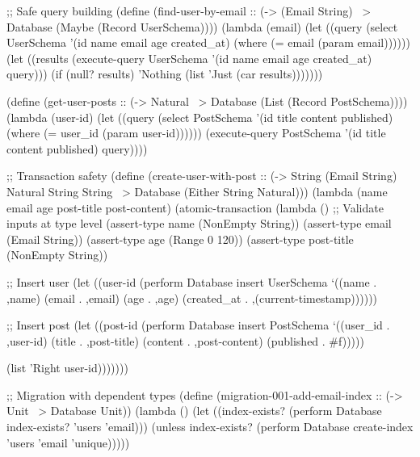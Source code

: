 \begin{example}
\begin{lambdustcode}
;; Safe query building
(define (find-user-by-email :: (-> (Email String) ~> {Database} (Maybe (Record UserSchema))))
  (lambda (email)
    (let ((query (select UserSchema '(id name email age created_at)
                   (where (= email (param email))))))
      (let ((results (execute-query UserSchema '(id name email age created_at) query)))
        (if (null? results)
            'Nothing
            (list 'Just (car results)))))))

(define (get-user-posts :: (-> Natural ~> {Database} (List (Record PostSchema))))
  (lambda (user-id)
    (let ((query (select PostSchema '(id title content published)
                   (where (= user_id (param user-id))))))
      (execute-query PostSchema '(id title content published) query))))

;; Transaction safety
(define (create-user-with-post :: (-> String (Email String) Natural String String
                                     ~> {Database} (Either String Natural)))
  (lambda (name email age post-title post-content)
    (atomic-transaction
      (lambda ()
        ;; Validate inputs at type level
        (assert-type name (NonEmpty String))
        (assert-type email (Email String))  
        (assert-type age (Range 0 120))
        (assert-type post-title (NonEmpty String))
        
        ;; Insert user
        (let ((user-id (perform Database insert UserSchema
                         `((name . ,name)
                           (email . ,email) 
                           (age . ,age)
                           (created_at . ,(current-timestamp))))))
          
          ;; Insert post
          (let ((post-id (perform Database insert PostSchema
                           `((user_id . ,user-id)
                             (title . ,post-title)
                             (content . ,post-content)
                             (published . #f)))))
            
            (list 'Right user-id)))))))

;; Migration with dependent types
(define (migration-001-add-email-index :: (-> Unit ~> {Database} Unit))
  (lambda ()
    (let ((index-exists? (perform Database index-exists? 'users 'email)))
      (unless index-exists?
        (perform Database create-index 'users 'email 'unique)))))


\end{lambdustcode}
\end{example}
